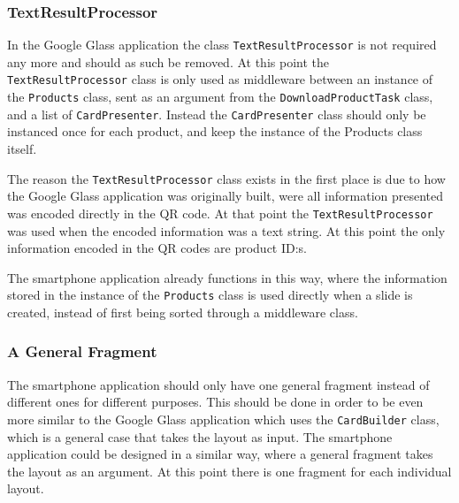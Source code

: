 
\subsubsection{TextResultProcessor}
In the Google Glass application the class \texttt{TextResultProcessor} is not required any more and should as such be removed. At this point the \texttt{TextResultProcessor} class is only used as middleware between an instance of the \texttt{Products} class, sent as an argument from the \texttt{DownloadProductTask} class, and a list of \texttt{CardPresenter}. Instead the \texttt{CardPresenter} class should only be instanced once for each product, and keep the instance of the Products class itself.

The reason the \texttt{TextResultProcessor} class exists in the first place is due to how the Google Glass application was originally built, were all information presented was encoded directly in the QR code. At that point the \texttt{TextResultProcessor} was used when the encoded information was a text string. At this point the only information encoded in the QR codes are product ID:s.

The smartphone application already functions in this way, where the information stored in the instance of the \texttt{Products} class is used directly when a slide is created, instead of first being sorted through a middleware class.


\subsubsection{A General Fragment}
The smartphone application should only have one general fragment instead of different ones for different purposes. This should be done in order to be even more similar to the Google Glass application which uses the \texttt{CardBuilder} class, which is a general case that takes the layout as input. The smartphone application could be designed in a similar way, where a general fragment takes the layout as an argument. At this point there is one fragment for each individual layout.